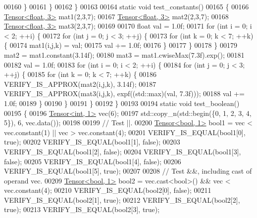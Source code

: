 \begin{DoxyCode}
00160     \}
00161   \}
00162 \}
00163 
00164 \textcolor{keyword}{static} \textcolor{keywordtype}{void} test\_constants()
00165 \{
00166   \hyperlink{class_eigen_1_1_tensor}{Tensor<float, 3>} mat1(2,3,7);
00167   \hyperlink{class_eigen_1_1_tensor}{Tensor<float, 3>} mat2(2,3,7);
00168   \hyperlink{class_eigen_1_1_tensor}{Tensor<float, 3>} mat3(2,3,7);
00169 
00170   \textcolor{keywordtype}{float} val = 1.0f;
00171   \textcolor{keywordflow}{for} (\textcolor{keywordtype}{int} i = 0; i < 2; ++i) \{
00172     \textcolor{keywordflow}{for} (\textcolor{keywordtype}{int} j = 0; j < 3; ++j) \{
00173       \textcolor{keywordflow}{for} (\textcolor{keywordtype}{int} k = 0; k < 7; ++k) \{
00174         mat1(i,j,k) = val;
00175         val += 1.0f;
00176       \}
00177     \}
00178   \}
00179   mat2 = mat1.constant(3.14f);
00180   mat3 = mat1.cwiseMax(7.3f).exp();
00181 
00182   val = 1.0f;
00183   \textcolor{keywordflow}{for} (\textcolor{keywordtype}{int} i = 0; i < 2; ++i) \{
00184     \textcolor{keywordflow}{for} (\textcolor{keywordtype}{int} j = 0; j < 3; ++j) \{
00185       \textcolor{keywordflow}{for} (\textcolor{keywordtype}{int} k = 0; k < 7; ++k) \{
00186         VERIFY\_IS\_APPROX(mat2(i,j,k), 3.14f);
00187         VERIFY\_IS\_APPROX(mat3(i,j,k), expf((std::max)(val, 7.3f)));
00188         val += 1.0f;
00189       \}
00190     \}
00191   \}
00192 \}
00193 
00194 \textcolor{keyword}{static} \textcolor{keywordtype}{void} test\_boolean()
00195 \{
00196   \hyperlink{class_eigen_1_1_tensor}{Tensor<int, 1>} vec(6);
00197   std::copy\_n(std::begin(\{0, 1, 2, 3, 4, 5\}), 6, vec.data());
00198 
00199   \textcolor{comment}{// Test ||.}
00200   \hyperlink{class_eigen_1_1_tensor}{Tensor<bool, 1>} bool1 = vec < vec.constant(1) || vec > vec.constant(4);
00201   VERIFY\_IS\_EQUAL(bool1[0], \textcolor{keyword}{true});
00202   VERIFY\_IS\_EQUAL(bool1[1], \textcolor{keyword}{false});
00203   VERIFY\_IS\_EQUAL(bool1[2], \textcolor{keyword}{false});
00204   VERIFY\_IS\_EQUAL(bool1[3], \textcolor{keyword}{false});
00205   VERIFY\_IS\_EQUAL(bool1[4], \textcolor{keyword}{false});
00206   VERIFY\_IS\_EQUAL(bool1[5], \textcolor{keyword}{true});
00207 
00208   \textcolor{comment}{// Test &&, including cast of operand vec.}
00209   \hyperlink{class_eigen_1_1_tensor}{Tensor<bool, 1>} bool2 = vec.cast<\textcolor{keywordtype}{bool}>() && vec < vec.constant(4);
00210   VERIFY\_IS\_EQUAL(bool2[0], \textcolor{keyword}{false});
00211   VERIFY\_IS\_EQUAL(bool2[1], \textcolor{keyword}{true});
00212   VERIFY\_IS\_EQUAL(bool2[2], \textcolor{keyword}{true});
00213   VERIFY\_IS\_EQUAL(bool2[3], \textcolor{keyword}{true});

\end{DoxyCode}
